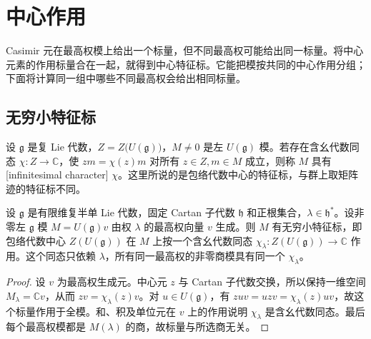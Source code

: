 
\section{中心作用}
\label{b5:sec:2002}

%
%

Casimir 元在最高权模上给出一个标量，但不同最高权可能给出同一标量。将中心元素的作用标量合在一起，就得到中心特征标。它能把模按共同的中心作用分组；下面将计算同一组中哪些不同最高权会给出相同标量。

\subsection{无穷小特征标}
\label{b5:subsec:2002:01}

\begin{definition}\label{b5:def:infinitesimal-character}
	设 \(\mathfrak g\) 是复 Lie 代数，\(Z=Z\bigl(U(\mathfrak g)\bigr)\)，\(M\ne0\) 是左 \(U(\mathfrak g)\) 模。若存在含幺代数同态 \(\chi:Z\to\mathbb C\)，使 \(zm=\chi(z)m\) 对所有 \(z\in Z,m\in M\) 成立，则称 \(M\) 具有[infinitesimal character] \(\chi\)。这里所说的是包络代数中心的特征标，与群上取矩阵迹的特征标不同。
\end{definition}

\begin{proposition}\label{b5:prop:highest-central-character}
	设 \(\mathfrak g\) 是有限维复半单 Lie 代数，固定 Cartan 子代数 \(\mathfrak h\) 和正根集合，\(\lambda\in\mathfrak h^*\)。设非零左 \(\mathfrak g\) 模 \(M=U(\mathfrak g)v\) 由权 \(\lambda\) 的最高权向量 \(v\) 生成。则 \(M\) 有无穷小特征标，即包络代数中心 \(Z(U(\mathfrak g))\) 在 \(M\) 上按一个含幺代数同态 \(\chi_\lambda:Z(U(\mathfrak g))\to\mathbb C\) 作用。这个同态只依赖 \(\lambda\)，所有同一最高权的非零商模具有同一个 \(\chi_\lambda\)。
\end{proposition}
\begin{proof}
	设 \(v\) 为最高权生成元。中心元 \(z\) 与 Cartan 子代数交换，所以保持一维空间 \(M_\lambda=\mathbb Cv\)，从而 \(zv=\chi_\lambda(z)v\)。对 \(u\in U(\mathfrak g)\)，有 \(zuv=uzv=\chi_\lambda(z)uv\)，故这个标量作用于全模。和、积及单位元在 \(v\) 上的作用说明 \(\chi_\lambda\) 是含幺代数同态。最后每个最高权模都是 \(M(\lambda)\) 的商，故标量与所选商无关。
\end{proof}

